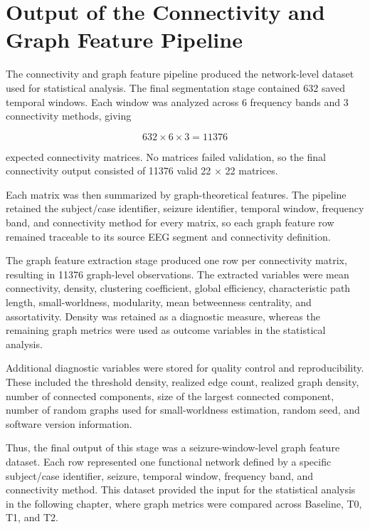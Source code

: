 \section{Output of the Connectivity and Graph Feature Pipeline}
\label{sec:connectivity-graph-pipeline-output}

The connectivity and graph feature pipeline produced the network-level dataset
used for statistical analysis. The final segmentation stage contained
\num{632} saved temporal windows. Each window was analyzed across \num{6}
frequency bands and \num{3} connectivity methods, giving

\[
    632 \times 6 \times 3 = \num{11376}
\]

expected connectivity matrices. No matrices failed validation, so the final
connectivity output consisted of \num{11376} valid \num{22} $\times$ \num{22}
matrices.

Each matrix was then summarized by graph-theoretical features. The pipeline
retained the subject/case identifier, seizure identifier, temporal window,
frequency band, and connectivity method for every matrix, so each graph feature
row remained traceable to its source EEG segment and connectivity definition.

The graph feature extraction stage produced one row per connectivity matrix,
resulting in \num{11376} graph-level observations. The extracted variables were
mean connectivity, density, clustering coefficient, global efficiency,
characteristic path length, small-worldness, modularity, mean betweenness
centrality, and assortativity. Density was retained as a diagnostic measure,
whereas the remaining graph metrics were used as outcome variables in the
statistical analysis.

Additional diagnostic variables were stored for quality control and
reproducibility. These included the threshold density, realized edge count,
realized graph density, number of connected components, size of the largest
connected component, number of random graphs used for small-worldness
estimation, random seed, and software version information.

Thus, the final output of this stage was a seizure-window-level graph feature
dataset. Each row represented one functional network defined by a specific
subject/case identifier, seizure, temporal window, frequency band, and
connectivity method. This dataset provided the input for the statistical
analysis in the following chapter, where graph metrics were compared across
Baseline, T0, T1, and T2.
